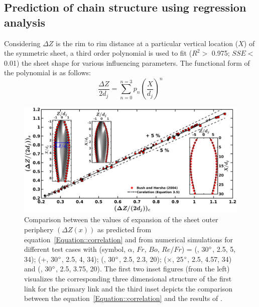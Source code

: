 \subsection{Prediction of chain structure using regression analysis}
Considering $\Delta Z$ is the rim to rim distance at a particular vertical location ($X$) of the symmetric sheet, a third order polynomial is used to fit ($R^2 >$ 0.975; $SSE <$ 0.01) the sheet shape for various influencing parameters. The functional form of the polynomial is as follows: 
\begin{equation}\label{Equation::correlation}
\frac{\Delta Z}{2d_j} = \sum_{n = 0}^{n = 3}p_n\left(\frac{X}{d_j}\right)^n
\end{equation}
\begin{figure}[t]
	\centering
	\includegraphics[width=\linewidth]{chapters/Figure9}
	\caption{Comparison between the values of expansion of the sheet outer periphery $\left(\Delta Z(x)\right)$ as predicted from equation~\ref{Equation::correlation} and from numerical simulations for different test cases with (symbol, $\alpha$, $Fr$, $Bo$, $Re/Fr$) = (\protect\MarkerSquareRed, 30$\degree$, 2.5, 5, 34); (+, 30$\degree$, 2.5, 4, 34); (\protect \MarkerDiamondBlack, 30$\degree$, 2.5, 2.3, 20); ($\times$, 25$\degree$, 2.5, 4.57, 34) and (\protect \MarkerCircleRed, 30$\degree$, 2.5, 3.75, 20). The first two inset figures (from the left) visualizes the corresponding three dimensional structure of the first link for the primary link and the third inset depicts the comparison between the equation~\ref{Equation::correlation} and the results of \cite{bush2004collision}.}
	\label{Figure::polyfit}
\end{figure}
